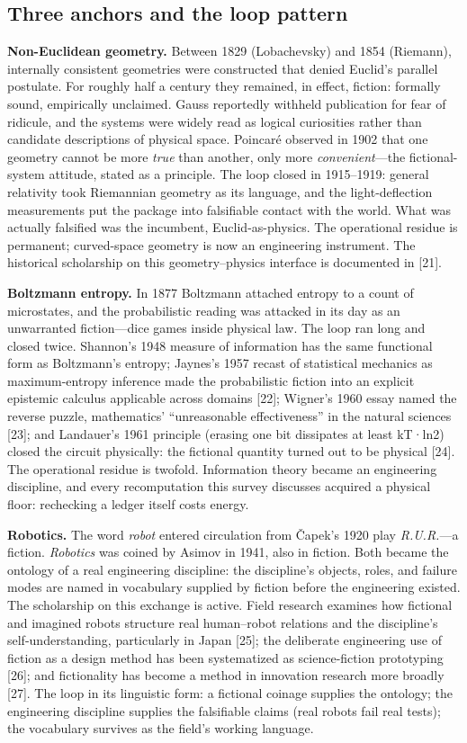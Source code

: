 \documentclass[11pt]{article}
\begin{document}
\subsection{Three anchors and the loop pattern}
\noindent \textbf{Non-Euclidean geometry.} Between 1829 (Lobachevsky) and 1854 (Riemann), internally consistent geometries were constructed that denied Euclid's parallel postulate. For roughly half a century they remained, in effect, fiction: formally sound, empirically unclaimed. Gauss reportedly withheld publication for fear of ridicule, and the systems were widely read as logical curiosities rather than candidate descriptions of physical space. Poincaré observed in 1902 that one geometry cannot be more \emph{true} than another, only more \emph{convenient}—the fictional-system attitude, stated as a principle. The loop closed in 1915–1919: general relativity took Riemannian geometry as its language, and the light-deflection measurements put the package into falsifiable contact with the world. What was actually falsified was the incumbent, Euclid-as-physics. The operational residue is permanent; curved-space geometry is now an engineering instrument. The historical scholarship on this geometry–physics interface is documented in [21].\par
\noindent \textbf{Boltzmann entropy.} In 1877 Boltzmann attached entropy to a count of microstates, and the probabilistic reading was attacked in its day as an unwarranted fiction—dice games inside physical law. The loop ran long and closed twice. Shannon's 1948 measure of information has the same functional form as Boltzmann's entropy; Jaynes's 1957 recast of statistical mechanics as maximum-entropy inference made the probabilistic fiction into an explicit epistemic calculus applicable across domains [22]; Wigner's 1960 essay named the reverse puzzle, mathematics' ``unreasonable effectiveness'' in the natural sciences [23]; and Landauer's 1961 principle (erasing one bit dissipates at least kT·ln2) closed the circuit physically: the fictional quantity turned out to be physical [24]. The operational residue is twofold. Information theory became an engineering discipline, and every recomputation this survey discusses acquired a physical floor: rechecking a ledger itself costs energy.\par
\noindent \textbf{Robotics.} The word \emph{robot} entered circulation from Čapek's 1920 play \emph{R.U.R.}—a fiction. \emph{Robotics} was coined by Asimov in 1941, also in fiction. Both became the ontology of a real engineering discipline: the discipline's objects, roles, and failure modes are named in vocabulary supplied by fiction before the engineering existed. The scholarship on this exchange is active. Field research examines how fictional and imagined robots structure real human–robot relations and the discipline's self-understanding, particularly in Japan [25]; the deliberate engineering use of fiction as a design method has been systematized as science-fiction prototyping [26]; and fictionality has become a method in innovation research more broadly [27]. The loop in its linguistic form: a fictional coinage supplies the ontology; the engineering discipline supplies the falsifiable claims (real robots fail real tests); the vocabulary survives as the field's working language.\par
\end{document}
